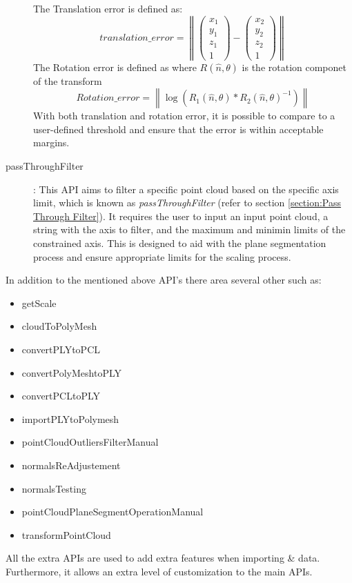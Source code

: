 \documentclass[12pt]{report}
\begin{document}
\begin{description}
   The Translation error is defined as:
   \begin{equation}
     translation\_error = \left\lVert \begin{pmatrix} x_1 \\y_1\\z_1\\1  \end{pmatrix} - \begin{pmatrix} x_2 \\y_2\\z_2\\1  \end{pmatrix} \right\rVert    
    \label{equ:translation error}
    \end{equation}
   The Rotation error is defined as where $R(\hat{n},\theta)$ is the rotation componet of the transform 
   \begin{equation}
     Rotation\_error =\left\lVert \log (R_1(\hat{n},\theta) * R_2(\hat{n},\theta)^{-1} ) \right\rVert 
   \end{equation}
 With both translation and rotation error, it is possible to compare to a user-defined threshold and ensure that the error is within acceptable margins. 
 \label{scale_API}
  \item[passThroughFilter]: This API aims to filter a specific point cloud based on the specific axis limit, which is known as \textit{passThroughFilter} (refer to section \ref{section:Pass Through Filter}).
  It requires the user to input an input point cloud, a string with the axis to filter, and the maximum and minimin limits of the constrained axis. This is designed to aid with the plane segmentation process and ensure appropriate limits for the scaling process.  
\end{description}

In addition to the mentioned above API's there area several other such as:
\begin{multicols}{2}
\begin{itemize}
  \itemsep0em 
  \item getScale
  \item cloudToPolyMesh
  \item convertPLYtoPCL
  \item convertPolyMeshtoPLY
  \item convertPCLtoPLY
  \item importPLYtoPolymesh
  \item pointCloudOutliersFilterManual
  \item normalsReAdjustement
  \item normalsTesting 
  \item pointCloudPlaneSegmentOperationManual
  \item transformPointCloud
\end{itemize}
\end{multicols}
All the extra APIs are used to add extra features when importing \& data. Furthermore, it allows an extra level of customization to the main APIs.  
\end{document}
